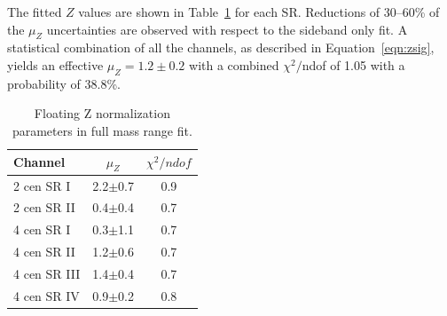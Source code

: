 The fitted $Z$ values are shown in Table~\ref{tab:zfullfit} for each SR.  Reductions of 30--60\% of the $\mu_Z$ uncertainties are observed with respect to the sideband only fit. A statistical combination of all the channels, as described in Equation~\ref{eqn:zsig}, yields an effective $\mu_Z = 1.2 \pm 0.2$ with a combined $\chi^2/$ndof of 1.05 with a probability of 38.8\%.  

\begin{table}[htbp]
\centering
\caption{Floating Z normalization parameters in full mass range fit.}
\label{tab:zfullfit}
\begin{tabular}{|l|c|c|}
\hline
Channel      & $\mu_{Z}$   & $\chi^2/ndof$ \\ \hline
2 cen SR I   & 2.2$\pm$0.7  & 0.9      \\ \hline
2 cen SR II  & 0.4$\pm$0.4  & 0.7        \\ \hline
4 cen SR I   & 0.3$\pm$1.1  & 0.7         \\ \hline
4 cen SR II  & 1.2$\pm$0.6  & 0.7        \\ \hline
4 cen SR III & 1.4$\pm$0.4  & 0.7         \\ \hline
4 cen SR IV  & 0.9$\pm$0.2  & 0.8          \\ \hline
\end{tabular}
\end{table}


%


